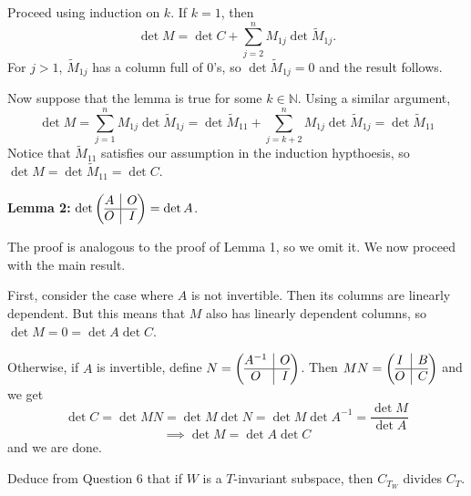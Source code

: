\documentclass{eh-homework}
\begin{document}
\begin{question}{6}
    Proceed using induction on \(k\). If \(k = 1\), then
    \[
        \det M = \det C + \sum_{j=2}^{n} M_{1j} \det \tilde{M}_{1j}.
    \]
    For \(j > 1\), \(\tilde{M}_{1j}\) has a column full of 0's, so \(\det \tilde{M}_{1j} = 0\) and the result follows.

    Now suppose that the lemma is true for some \(k \in \mathbb{N}\). Using a similar argument,
    \[
        \det M = \sum_{j=1}^{n} M_{1j} \det \tilde{M}_{1j} = \det \tilde{M}_{11} + \sum_{j=k+2}^{n} M_{1j} \det \tilde{M}_{1j} = \det \tilde{M}_{11}
    \]
    Notice that \(\tilde{M}_{11}\) satisfies our assumption in the induction hypthoesis, so \(\det M = \det \tilde{M}_{11} = \det C\).

    \medskip

    \textbf{Lemma 2:} \(\det \left( \begin{array}{@{}c|c@{}}
        A & O \\
        \hline
        O & I
    \end{array} \right) = \det A\).

    The proof is analogous to the proof of Lemma 1, so we omit it. We now proceed with the main result.

    First, consider the case where \(A\) is not invertible. Then its columns are linearly dependent. But this means that \(M\) also has linearly dependent columns, so \(\det M = 0 = \det A \det C\).

    Otherwise, if \(A\) is invertible, define \(N = \left( \begin{array}{@{}c|c@{}}
        A^{-1} & O \\
        \hline
        O & I
    \end{array} \right)\). Then \(MN = \left( \begin{array}{@{}c|c@{}}
            I & B \\
            \hline
            O & C
        \end{array} \right)\) and we get
    \[
        \det C = \det MN = \det M \det N = \det M \det A^{-1} = \frac{\det M}{\det A}
    \]
    \[
        \implies \det M = \det A \det C
    \]
    and we are done.
    \end{question}
    
    \begin{question}{7}
    Deduce from Question 6 that if $W$ is a $T$-invariant subspace, then $C_{T_W}$ divides $C_T$.
    \end{question}
    
\end{document}
